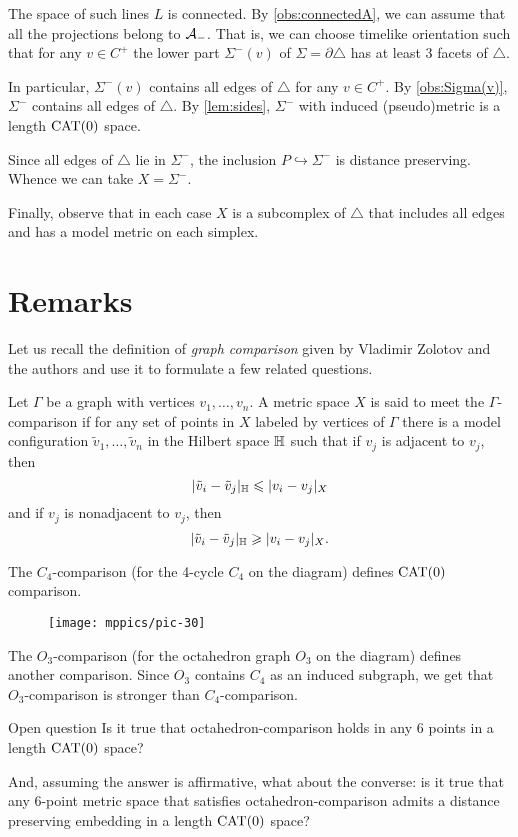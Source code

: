 \documentclass{article}
\begin{document}
The space of such lines $L$ is connected.
By \ref{obs:connectedA}, we can assume that all the projections belong to $\mathcal{A}_-$.
That is, we can choose timelike orientation such that for any $v\in C^+$ the lower part $\Sigma^-(v)$ of $\Sigma=\partial \triangle$ has at least 3 facets of $\triangle$.

In particular, $\Sigma^-(v)$ contains all edges of $\triangle$ for any $v\in C^+$.
By \ref{obs:Sigma(v)}, $\Sigma^-$ contains all edges of $\triangle$.
By \ref{lem:sides}, $\Sigma^-$ with induced (pseudo)metric is a length $\mathrm{CAT}(0)$ space.

Since all edges of $\triangle$ lie in $\Sigma^-$, the inclusion $P\hookrightarrow \Sigma^-$ is distance preserving.
Whence we can take $X=\Sigma^-$.

Finally, observe that in each case $X$ is a subcomplex of $\triangle$ that includes all edges and has a model metric on each simplex.
\qeds

\section{Remarks}

Let us recall the definition of \emph{graph comparison} given by Vladimir Zolotov and the authors \cite{lebedeva-petrunin-zolotov} and use it to formulate a few related questions.

Let $\Gamma$ be a graph with vertices $v_1,\dots,v_n$.
A metric space $X$ is said to meet the $\Gamma$-comparison if for any set of points in $X$ labeled by vertices of $\Gamma$ there is a model configuration $\tilde v_1,\dots,\tilde v_n$ in the Hilbert space $\mathbb H$ such that 
if $v_j$ is adjacent to $v_j$, then
\[|\tilde v_i-\tilde v_j|_{\mathbb H}\leqslant | v_i-v_j|_{X}\]
and
if $v_j$ is nonadjacent to $v_j$, then
\[|\tilde v_i-\tilde v_j|_{\mathbb H}\geqslant | v_i-v_j|_{X}.\]

The $C_4$-comparison (for the 4-cycle $C_4$ on the diagram) defines $\mathrm{CAT}(0)$ comparison.
\begin{figure}[h!]
\vskip-0mm
\centering
\texttt{[image: mppics/pic-30]}
\end{figure}
The $O_3$-comparison (for the octahedron graph $O_3$ on the diagram) defines another comparison.
Since $O_3$ contains $C_4$ as an induced subgraph, we get that $O_3$-comparison is stronger than $C_4$-comparison.

\begin{thm}{Open question}
Is it true that octahedron-comparison holds in any 6 points in a length $\mathrm{CAT}(0)$ space?

And, assuming the answer is affirmative, what about the converse: is it true that any 6-point metric space that satisfies octahedron-comparison admits a distance preserving embedding in a length $\mathrm{CAT}(0)$ space?
\end{thm}
\end{document}
